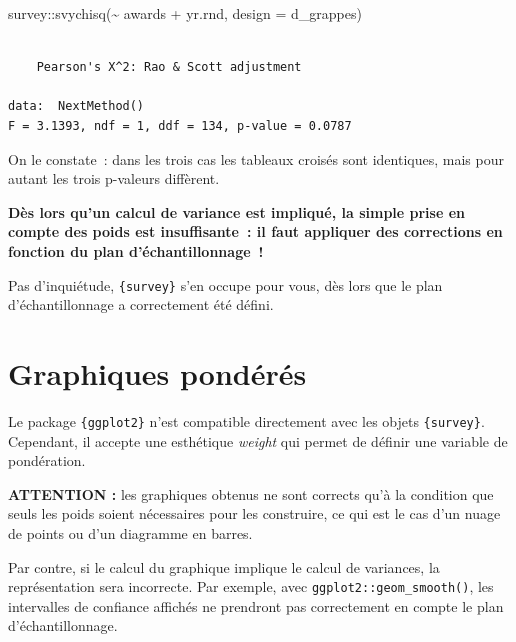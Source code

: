 \documentclass[
  letterpaper,
  DIV=11,
  numbers=noendperiod,
  oneside]{scrreprt}
\newenvironment{Shaded}{\begin{snugshade}}{\end{snugshade}}
\newcommand{\AttributeTok}[1]{\textcolor[rgb]{0.40,0.45,0.13}{#1}}
\newcommand{\FunctionTok}[1]{\textcolor[rgb]{0.28,0.35,0.67}{#1}}
\newcommand{\NormalTok}[1]{\textcolor[rgb]{0.00,0.23,0.31}{#1}}
\newcommand{\SpecialCharTok}[1]{\textcolor[rgb]{0.37,0.37,0.37}{#1}}
\begin{document}
\begin{Shaded}
\begin{Highlighting}[]
\NormalTok{survey}\SpecialCharTok{::}\FunctionTok{svychisq}\NormalTok{(}\SpecialCharTok{\textasciitilde{}}\NormalTok{ awards }\SpecialCharTok{+}\NormalTok{ yr.rnd, }\AttributeTok{design =}\NormalTok{ d\_grappes)}
\end{Highlighting}
\end{Shaded}

\begin{verbatim}

    Pearson's X^2: Rao & Scott adjustment

data:  NextMethod()
F = 3.1393, ndf = 1, ddf = 134, p-value = 0.0787
\end{verbatim}

On le constate~: dans les trois cas les tableaux croisés sont
identiques, mais pour autant les trois p-valeurs diffèrent.

\textbf{Dès lors qu'un calcul de variance est impliqué, la simple prise
en compte des poids est insuffisante~: il faut appliquer des corrections
en fonction du plan d'échantillonnage~!}

Pas d'inquiétude, \texttt{\{survey\}} s'en occupe pour vous, dès lors
que le plan d'échantillonnage a correctement été défini.

\hypertarget{sec-graphiques-ponderes}{%
\chapter{Graphiques pondérés}\label{sec-graphiques-ponderes}}

Le package \texttt{\{ggplot2\}} n'est compatible directement avec les
objets \texttt{\{survey\}}. Cependant, il accepte une esthétique
\emph{weight} qui permet de définir une variable de pondération.

\begin{tcolorbox}[enhanced jigsaw, colbacktitle=quarto-callout-warning-color!10!white, opacityback=0, toprule=.15mm, colback=white, coltitle=black, bottomtitle=1mm, toptitle=1mm, titlerule=0mm, rightrule=.15mm, title=\textcolor{quarto-callout-warning-color}{\faExclamationTriangle}\hspace{0.5em}{Avertissement}, breakable, bottomrule=.15mm, opacitybacktitle=0.6, arc=.35mm, left=2mm, leftrule=.75mm, colframe=quarto-callout-warning-color-frame]

\textbf{ATTENTION :} les graphiques obtenus ne sont corrects qu'à la
condition que seuls les poids soient nécessaires pour les construire, ce
qui est le cas d'un nuage de points ou d'un diagramme en barres.

Par contre, si le calcul du graphique implique le calcul de variances,
la représentation sera incorrecte. Par exemple, avec
\texttt{ggplot2::geom\_smooth()}, les intervalles de confiance affichés
ne prendront pas correctement en compte le plan d'échantillonnage.

\end{tcolorbox}
\end{document}
